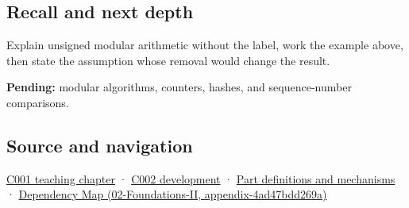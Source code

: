 \subsection{Recall and next depth}\label{recall-and-next-depth}

Explain unsigned modular arithmetic without the label, work the example above, then state the assumption whose removal would change the result.

\textbf{Pending:} modular algorithms, counters, hashes, and sequence-number comparisons.

\subsection{Source and navigation}\label{source-and-navigation}

\href{Continuous\%20Notes/Computing\%20Foundations\%20-\%20From\%20Bits\%20to\%20C++\%20and\%20Systems\%20APIs\#From\%20a\%20signal\%20to\%20an\%20interpretation}{C001 teaching chapter} · \href{Continuous\%20Notes/Computing\%20Foundations\%20-\%20From\%20Bits\%20to\%20C++\%20and\%20Systems\%20APIs\#Arithmetic\%20becomes\%20a\%20policy}{C002 development} · \hyperref[appendix-fd090d982a15]{Part definitions and mechanisms} · \href{}{Dependency Map (02-Foundations-II, appendix-4ad47bdd269a)}
